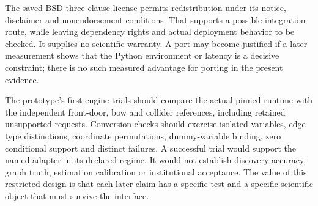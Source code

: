 The saved BSD three-clause license permits redistribution under its
notice, disclaimer and nonendorsement conditions. That supports a
possible integration route, while leaving dependency rights and actual
deployment behavior to be checked. It supplies no scientific warranty. A
port may become justified if a later measurement shows that the Python
environment or latency is a decisive constraint; there is no such
measured advantage for porting in the present evidence.
\citep{exec13_y0_license}

The prototype's first engine trials should compare the actual pinned
runtime with the independent front-door, bow and collider references,
including retained unsupported requests. Conversion checks should
exercise isolated variables, edge-type distinctions, coordinate
permutations, dummy-variable binding, zero conditional support and
distinct failures. A successful trial would support the named adapter in
its declared regime. It would not establish discovery accuracy, graph
truth, estimation calibration or institutional acceptance. The value of
this restricted design is that each later claim has a specific test and
a specific scientific object that must survive the interface.
\label{exec13:python-identification-end}
